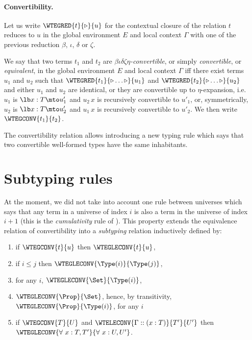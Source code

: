 \paragraph[Convertibility.]{Convertibility.\label{convertibility}
}

Let us write $\WTEGRED{t}{\triangleright}{u}$ for the contextual closure of the relation $t$ reduces to $u$ in the global environment $E$ and local context $\Gamma$ with one of the previous reduction $\beta$, $\iota$, $\delta$ or $\zeta$.

We say that two terms $t_1$ and $t_2$ are {\em
  $\beta\iota\delta\zeta\eta$-convertible}, or simply {\em
  convertible}, or {\em equivalent}, in the global environment $E$ and
local context $\Gamma$ iff there exist terms $u_1$ and $u_2$ such that
$\WTEGRED{t_1}{\triangleright \ldots \triangleright}{u_1}$ and
$\WTEGRED{t_2}{\triangleright \ldots \triangleright}{u_2}$ and either
$u_1$ and $u_2$ are identical, or they are convertible up to
$\eta$-expansion, i.e. $u_1$ is $\lb x:T\mto u'_1$ and $u_2\,x$ is
recursively convertible to $u'_1$, or, symmetrically, $u_2$ is $\lb
x:T\mto u'_2$ and $u_1\,x$ is recursively convertible to $u'_2$.  We
then write $\WTEGCONV{t_1}{t_2}$.

The convertibility relation allows introducing a new typing rule
which says that two convertible well-formed types have the same
inhabitants.

\section[Subtyping rules]{Subtyping rules
\label{subtyping-rules}}

At the moment, we did not take into account one rule between universes
which says that any term in a universe of index $i$ is also a term in
the universe of index $i+1$ (this is the {\em cumulativity} rule of
{\CIC}). This property extends the equivalence relation of
convertibility into a {\em subtyping} relation inductively defined by:
\begin{enumerate}
\item if $\WTEGCONV{t}{u}$ then $\WTEGLECONV{t}{u}$,
\item if $i \leq j$ then $\WTEGLECONV{\Type(i)}{\Type(j)}$,
\item for any $i$, $\WTEGLECONV{\Set}{\Type(i)}$,
\item $\WTEGLECONV{\Prop}{\Set}$, hence, by transitivity,
  $\WTEGLECONV{\Prop}{\Type(i)}$, for any $i$
\item if $\WTEGCONV{T}{U}$ and $\WTELECONV{\Gamma::(x:T)}{T'}{U'}$ then $\WTEGLECONV{\forall~x:T, T'}{\forall~x:U, U'}$.
\end{enumerate}

